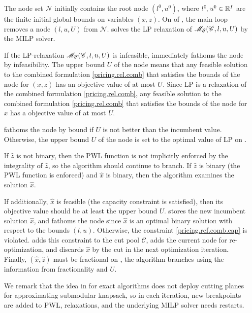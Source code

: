 The node set $\mathscr{N}$ initially contains the root node $(l^0, u^0)$, where $l^0, u^0 \in \mathbb R^I$ are the finite initial global bounds on variables \((x,z)\).
On  of , the main loop removes a node $(l, u, U)$ from $\mathscr{N}$.   solves the  LP  relaxation  of \(\mathscr{M}_\mathcal B(\mathscr{C}, l, u, U)\) by the MILP solver.


If the LP-relaxation \(\mathscr{M}_\mathcal B(\mathscr{C}, l, u, U)\) is infeasible,  immediately fathoms the node by infeasibility. The upper bound $U$ of the node means that any feasible solution to the combined formulation \eqref{pricing.rel.comb} that satisfies the bounds of the node for \((x,z)\) has an objective value of at most $U$. Since LP is a relaxation of the combined formulation \eqref{pricing.rel.comb}, any feasible solution to the combined formulation \eqref{pricing.rel.comb} that satisfies the bounds of the node for \(x\) has a objective value of at most $U$.

 fathoms the node by bound if $U$ is not better than the incumbent value. Otherwise, the upper bound $U$ of the node is set to the optimal value of LP on .


If $\hat{z}$ is not binary, then the PWL function is not implicitly enforced by the integrality of $\hat{z}$, so the algorithm should continue to branch. If $\hat{z}$ is binary (the PWL function is enforced) and $\hat{x}$ is binary, then the algorithm examines the solution $\hat{x}$.

If additionally, $\hat{x}$ is feasible (the capacity constraint is satisfied), then its objective value  should be at least the upper bound \(U\).  stores the new incumbent solution $\hat{x}$, and  fathoms the node since \(\hat{x}\) is an optimal binary solution with respect to the bounds $(l,u)$.  Otherwise, the constraint \eqref{pricing.ref.comb.cap} is  violated.  adds this constraint to the cut pool \(\mathscr{C}\),  adds the current node for re-optimization, and  discards $\hat{x}$ by the cut in the next optimization iteration. Finally, $(\hat{x},\hat{z})$ must be fractional on , the algorithm branches using the information from fractionality and $U$.


We remark that the idea in \cite{shylo2013} for exact algorithms does not deploy  cutting planes for approximating submodular knapsack, so in each iteration, new breakpoints are added to PWL, relaxations, and the underlying MILP solver needs restarts.


